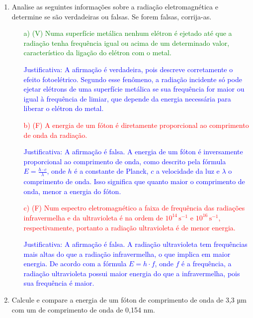 \documentclass[a4paper, 12pt]{article}
\begin{document}
\begin{enumerate}
	\item Analise as seguintes informações sobre a radiação eletromagnética e determine se são verdadeiras ou falsas. Se forem falsas, corrija-as.
	      \begin{enumerate}
		      \item[\textcolor{green}{a)}] \textcolor{green}{(V) Numa superfície metálica nenhum elétron é ejetado até que a radiação tenha frequência igual ou acima de um determinado valor, característico da ligação do elétron com o metal.}
		      \item[] \textcolor{blue}{
			            Justificativa: A afirmação é verdadeira, pois descreve corretamente o efeito fotoelétrico. Segundo esse fenômeno, a radiação incidente só pode ejetar elétrons de uma superfície metálica se sua frequência for maior ou igual à frequência de limiar, que depende da energia necessária para liberar o elétron do metal.
		            }
		      \item[\textcolor{red}{b)}] \textcolor{red}{(F) A energia de um fóton é diretamente proporcional ao comprimento de onda da radiação.}
		      \item[] \textcolor{blue}{
			            Justificativa: A afirmação é falsa. A energia de um fóton é inversamente proporcional ao comprimento de onda, como descrito pela fórmula \( E = \frac{h \cdot c}{\lambda} \), onde \( h \) é a constante de Planck, \( c \) a velocidade da luz e \( \lambda \) o comprimento de onda. Isso significa que quanto maior o comprimento de onda, menor a energia do fóton.
		            }
		            \pagebreak
		      \item[\textcolor{red}{c)}] \textcolor{red}{(F) Num espectro eletromagnético a faixa de frequência das radiações infravermelha e da ultravioleta é na ordem de \(10^{14} \, \text{s}^{-1}\) e \(10^{16} \, \text{s}^{-1}\), respectivamente, portanto a radiação ultravioleta é de menor energia.}
		      \item[] \textcolor{blue}{
			            Justificativa: A afirmação é falsa. A radiação ultravioleta tem frequências mais altas do que a radiação infravermelha, o que implica em maior energia. De acordo com a fórmula \( E = h \cdot f \), onde \( f \) é a frequência, a radiação ultravioleta possui maior energia do que a infravermelha, pois sua frequência é maior.
		            }
	      \end{enumerate}
	      
	\item Calcule e compare a energia de um fóton de comprimento de onda de 3,3 µm com um de comprimento de onda de 0,154 nm.
	      

\end{enumerate}
\end{document}
